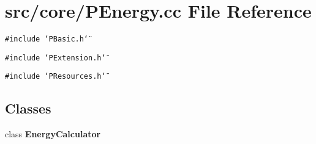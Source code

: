 \section{src/core/PEnergy.cc File Reference}
\label{PEnergy_8cc}


{\tt \#include \char`\"{}PBasic.h\char`\"{}}\par
{\tt \#include \char`\"{}PExtension.h\char`\"{}}\par
{\tt \#include \char`\"{}PResources.h\char`\"{}}\par
\subsection*{Classes}
\begin{CompactItemize}
\item 
class {\bf Energy\-Calculator}
\end{CompactItemize}
